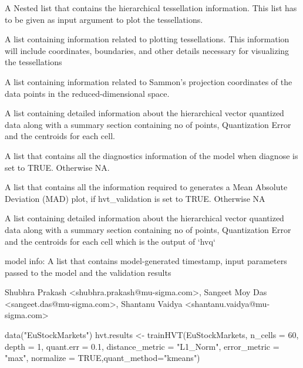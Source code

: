 \documentclass[letterpaper]{book}
\begin{document}
\begin{Value}
A Nested list that contains the hierarchical tessellation information. This
list has to be given as input argument to plot the tessellations.
\begin{ldescription}
\item[\code{[[1]] }] A list containing information related to plotting tessellations. 
This information will include coordinates, boundaries, and other details necessary for visualizing the tessellations
\item[\code{[[2]] }] A list containing information related to Sammon’s projection coordinates of the data points
in the reduced-dimensional space.
\item[\code{[[3]] }] A list containing detailed information about the hierarchical vector quantized data along with 
a summary section containing no of points, Quantization Error and the centroids for each cell.
\item[\code{[[4]] }] A list that contains all the diagnostics information of the model when diagnose is set to TRUE. 
Otherwise NA.
\item[\code{[[5]] }] A list that contains all the information required to generates a Mean Absolute Deviation (MAD) plot, 
if hvt\_validation is set to TRUE. Otherwise NA
\item[\code{[[6]]}] A list containing detailed information about the hierarchical vector quantized data along with a
summary section containing no of points, Quantization Error and the centroids for each cell which is the output of `hvq`
\item[\code{[[7]]}] model info: A list that contains model-generated timestamp, input parameters passed to the model 
and the validation results
\end{ldescription}
\end{Value}
%
\begin{Author}
Shubhra Prakash <shubhra.prakash@mu-sigma.com>, Sangeet Moy Das <sangeet.das@mu-sigma.com>, Shantanu Vaidya <shantanu.vaidya@mu-sigma.com>
\end{Author}
%
\begin{SeeAlso}
\end{SeeAlso}
%
\begin{Examples}
\begin{ExampleCode}
data("EuStockMarkets")
hvt.results <- trainHVT(EuStockMarkets, n_cells = 60, depth = 1, quant.err = 0.1, 
                       distance_metric = "L1_Norm", error_metric = "max",
                       normalize = TRUE,quant_method="kmeans")
\end{ExampleCode}
\end{Examples}
\end{document}
